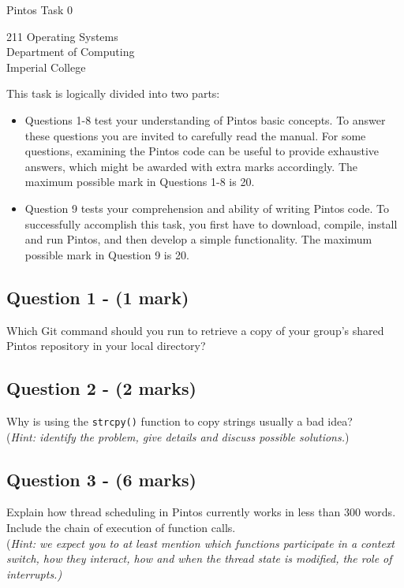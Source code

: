 \documentclass[a4paper,12pt]{article}
\begin{document}
\small

\begin{center}
\begin{LARGE}
Pintos Task 0
\end{LARGE}
\end{center}

\begin{center}
211 Operating Systems \\
Department of Computing \\
Imperial College
\end{center}

This task is logically divided into two parts:
\begin{itemize}
\item Questions 1-8 test your understanding of Pintos basic concepts. 
      To answer these questions you are invited to carefully read the manual. 
      For some questions, examining the Pintos code can be useful to provide exhaustive answers, which might be awarded with extra marks accordingly. 
      The maximum possible mark in Questions 1-8 is 20.
      
\item Question 9 tests your comprehension and ability of writing Pintos code. 
      To successfully accomplish this task, you first have to download, compile, install and run Pintos, and then develop a simple functionality. 
      The maximum possible mark in Question 9 is 20. 
\end{itemize}

\subsection*{Question 1 - (1 mark)}
Which Git command should you run to retrieve a copy of your group’s shared Pintos repository in your local directory?

\subsection*{Question 2 - (2 marks)}
Why is using the \texttt{strcpy()} function to copy strings usually a bad idea? \\
(\textit{Hint: identify the problem, give details and discuss possible solutions.})

\subsection*{Question 3 - (6 marks)}
Explain how thread scheduling in Pintos currently works in less than 300 words. 
Include the chain of execution of function calls. \\
(\textit{Hint: we expect you to at least mention which functions participate in a context switch, how they interact, how and when the thread state is modified, the role of interrupts.)}
\end{document}

